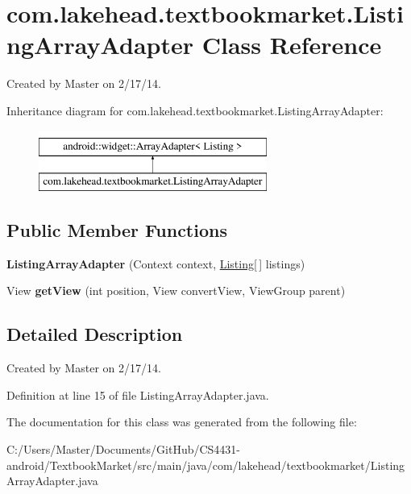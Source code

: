 \hypertarget{classcom_1_1lakehead_1_1textbookmarket_1_1_listing_array_adapter}{\section{com.\-lakehead.\-textbookmarket.\-Listing\-Array\-Adapter Class Reference}
\label{classcom_1_1lakehead_1_1textbookmarket_1_1_listing_array_adapter}
}


Created by Master on 2/17/14.  


Inheritance diagram for com.\-lakehead.\-textbookmarket.\-Listing\-Array\-Adapter\-:\begin{figure}[H]
\begin{center}
\leavevmode
\includegraphics[height=2.000000cm]{classcom_1_1lakehead_1_1textbookmarket_1_1_listing_array_adapter}
\end{center}
\end{figure}
\subsection*{Public Member Functions}
\begin{DoxyCompactItemize}
\item 
\hypertarget{classcom_1_1lakehead_1_1textbookmarket_1_1_listing_array_adapter_afc30d3794184b7d2690cab6f995e1452}{{\bfseries Listing\-Array\-Adapter} (Context context, \hyperlink{classcom_1_1lakehead_1_1textbookmarket_1_1_listing}{Listing}\mbox{[}$\,$\mbox{]} listings)}\label{classcom_1_1lakehead_1_1textbookmarket_1_1_listing_array_adapter_afc30d3794184b7d2690cab6f995e1452}

\item 
\hypertarget{classcom_1_1lakehead_1_1textbookmarket_1_1_listing_array_adapter_aa264a57810bf5d85ae900de9e67069d1}{View {\bfseries get\-View} (int position, View convert\-View, View\-Group parent)}\label{classcom_1_1lakehead_1_1textbookmarket_1_1_listing_array_adapter_aa264a57810bf5d85ae900de9e67069d1}

\end{DoxyCompactItemize}


\subsection{Detailed Description}
Created by Master on 2/17/14. 

Definition at line 15 of file Listing\-Array\-Adapter.\-java.



The documentation for this class was generated from the following file\-:\begin{DoxyCompactItemize}
\item 
C\-:/\-Users/\-Master/\-Documents/\-Git\-Hub/\-C\-S4431-\/android/\-Textbook\-Market/src/main/java/com/lakehead/textbookmarket/Listing\-Array\-Adapter.\-java\end{DoxyCompactItemize}
